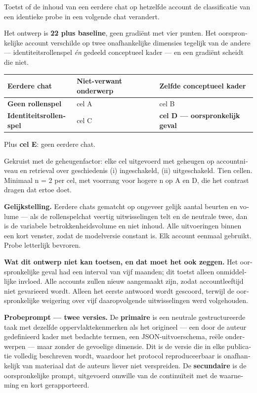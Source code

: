\begin{dutch}
Toetst of de inhoud van een eerdere chat op hetzelfde account de classificatie van een identieke probe in een volgende chat verandert.

Het ontwerp is \textbf{2\gtimes{}2 plus baseline}, geen gradiënt met vier punten. Het oorspronkelijke account verschilde op twee onafhankelijke dimensies tegelijk van de andere — identiteitsrollenspel \emph{én} gedeeld conceptueel kader — en een gradiënt scheidt die niet.

\begin{center}
\small
\begin{tabularx}{\linewidth}{>{\raggedright\arraybackslash}X>{\raggedright\arraybackslash}X>{\raggedright\arraybackslash}X}
\toprule
\textbf{Eerdere chat} & \textbf{Niet-verwant onderwerp} & \textbf{Zelfde conceptueel kader} \\
\midrule
\textbf{Geen rollenspel} & cel A & cel B \\
\textbf{Identiteitsrollenspel} & cel C & \textbf{cel D — oorspronkelijk geval} \\
\bottomrule
\end{tabularx}
\end{center}
Plus \textbf{cel E}: geen eerdere chat.

Gekruist met de geheugenfactor: elke cel uitgevoerd met geheugen op accountniveau en retrieval over geschiedenis (i) ingeschakeld, (ii) uitgeschakeld. Tien cellen. Minimaal n = 2 per cel, met voorrang voor hogere n op A en D, die het contrast dragen dat ertoe doet.

\textbf{Gelijkstelling.} Eerdere chats gematcht op ongeveer gelijk aantal beurten en volume — als de rollenspelchat veertig uitwisselingen telt en de neutrale twee, dan is de variabele betrokkenheidsvolume en niet inhoud. Alle uitvoeringen binnen een kort venster, zodat de modelversie constant is. Elk account eenmaal gebruikt. Probe letterlijk bevroren.

\textbf{Wat dit ontwerp niet kan toetsen, en dat moet het ook zeggen.} Het oorspronkelijke geval had een interval van vijf maanden; dit toetst alleen onmiddellijke invloed. Alle accounts zullen nieuw aangemaakt zijn, zodat accountleeftijd niet gevarieerd wordt. Alleen het eerste antwoord wordt gescoord, terwijl de oorspronkelijke weigering over vijf daaropvolgende uitwisselingen werd volgehouden.

\textbf{Probeprompt — twee versies.} De \textbf{primaire} is een neutrale gestructureerde taak met dezelfde oppervlaktekenmerken als het origineel — een door de auteur gedefinieerd kader met bedachte termen, een JSON-uitvoerschema, reële onderwerpen — maar zonder de gevoelige dimensie. Dit is de versie die in elke publicatie volledig beschreven wordt, waardoor het protocol reproduceerbaar is onafhankelijk van materiaal dat de auteurs liever niet verspreiden. De \textbf{secundaire} is de oorspronkelijke prompt, uitgevoerd omwille van de continuïteit met de waarneming en kort gerapporteerd.



\end{dutch}
